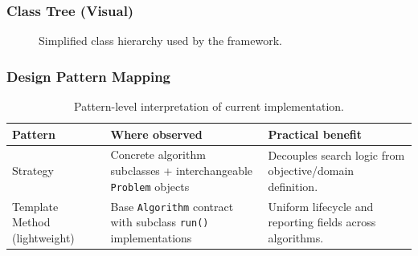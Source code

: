 \subsubsection{Class Tree (Visual)}
\begin{figure}[H]
\centering
{}
\caption{Simplified class hierarchy used by the framework.}
\label{fig:class-hierarchy}
\end{figure}

\subsubsection{Design Pattern Mapping}
\begin{table}[H]
\centering
\caption{Pattern-level interpretation of current implementation.}
\label{tab:pattern-mapping}
\begin{tabular}{p{2.7cm} p{4.2cm} p{5.6cm}}
\hline
\textbf{Pattern} & \textbf{Where observed} & \textbf{Practical benefit} \\
\hline
Strategy & Concrete algorithm subclasses + interchangeable \texttt{Problem} objects & Decouples search logic from objective/domain definition. \\
Template Method (lightweight) & Base \texttt{Algorithm} contract with subclass \texttt{run()} implementations & Uniform lifecycle and reporting fields across algorithms. \\
\hline
\end{tabular}
\end{table}

